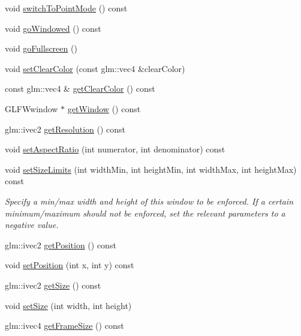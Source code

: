 \begin{DoxyCompactItemize}
\item 
void \mbox{\hyperlink{classec_1_1_window_a633ebdd1e469a3a865f4748b99f9c664}{switch\+To\+Point\+Mode}} () const
\item 
void \mbox{\hyperlink{classec_1_1_window_aeeaa47b1f8199b4df60f74aa3b2c45f7}{go\+Windowed}} () const
\item 
void \mbox{\hyperlink{classec_1_1_window_ab89e0e27d169da6f5d9430b78c77c0ee}{go\+Fullscreen}} ()
\item 
void \mbox{\hyperlink{classec_1_1_window_a915c4b64dde5f2274e59c40bc10eff58}{set\+Clear\+Color}} (const glm\+::vec4 \&clear\+Color)
\item 
const glm\+::vec4 \& \mbox{\hyperlink{classec_1_1_window_a4355925b4898e5b032da048eec86f103}{get\+Clear\+Color}} () const
\item 
G\+L\+F\+Wwindow $\ast$ \mbox{\hyperlink{classec_1_1_window_abe525ce2f27fecf298b1ad0926024ae3}{get\+Window}} () const
\item 
glm\+::ivec2 \mbox{\hyperlink{classec_1_1_window_a6ae374e668f695a5388f03e2ab6d0b58}{get\+Resolution}} () const
\item 
void \mbox{\hyperlink{classec_1_1_window_abe49e52c64cce2e71ba17f25521d00eb}{set\+Aspect\+Ratio}} (int numerator, int denominator) const
\item 
void \mbox{\hyperlink{classec_1_1_window_ab67b420e089268ae3efa76d44a2df9f9}{set\+Size\+Limits}} (int width\+Min, int height\+Min, int width\+Max, int height\+Max) const
\begin{DoxyCompactList}\small\item\em Specify a min/max width and height of this window to be enforced. If a certain minimum/maximum should not be enforced, set the relevant parameters to a negative value. \end{DoxyCompactList}\item 
glm\+::ivec2 \mbox{\hyperlink{classec_1_1_window_aa426ec0e5657e6f5583f28abf1f4455a}{get\+Position}} () const
\item 
void \mbox{\hyperlink{classec_1_1_window_a093cfa214eafa8cfd1045d23b4e05d60}{set\+Position}} (int x, int y) const
\item 
glm\+::ivec2 \mbox{\hyperlink{classec_1_1_window_a158535fbd92301f05ea6588b50abf5fb}{get\+Size}} () const
\item 
void \mbox{\hyperlink{classec_1_1_window_af3dce1755c782305930bdc6fb5d4c425}{set\+Size}} (int width, int height)
\item 
glm\+::ivec4 \mbox{\hyperlink{classec_1_1_window_ab97322933ab8306533a1ab9b3e2fb57d}{get\+Frame\+Size}} () const

\end{DoxyCompactItemize}
